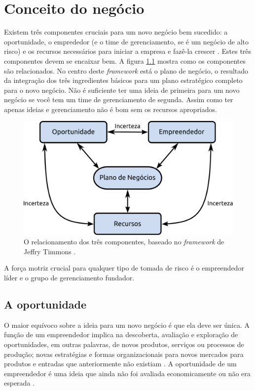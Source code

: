 \chapter{Conceito do negócio}

Existem três componentes cruciais para um novo negócio bem sucedido: a
oportunidade, o emprededor (e o time de gerenciamento, se é um negócio 
de alto risco) e os recursos necessários para iniciar a empresa e fazê-la
crescer \cite{bygrave2010entrepreneurship}. %
Estes três componentes devem se encaixar bem.
A figura \ref{componentes} mostra como os componentes são relacionados.
No centro deste \textit{framework}
está o plano de negócio, o resultado da integração dos três ingredientes
básicos para um plano estratégico completo para o novo negócio.
Não é suficiente ter uma ideia de primeira para um novo negócio se você tem 
um time de gerenciamento de segunda.  Assim como ter apenas ideias e gerenciamento
não é bom sem os recursos apropriados. 

\begin{figure}[!h]
	\begin{center}
		\includegraphics[scale=0.5]{../slides/imagens/componentes.pdf}
	\end{center}
	\caption{\label{componentes} O relacionamento dos três componentes, baseado no 
		\textit{framework} de Jeffry Timmons \cite{timmons2004new}.}			
\end{figure}

A força motriz crucial para qualquer tipo de tomada de risco é o empreendedor
líder e o grupo de gerenciamento fundador.

\section{A oportunidade}

O maior equívoco sobre a ideia para um novo negócio é que ela deve ser
única.  A função de um empreendedor implica na descoberta, avaliação
e exploração de oportunidades, em outras palavras, de novos produtos, 
serviços ou processos de produção; novas estratégias e formas
organizacionais para novos mercados para produtos
e entradas que anteriormente não existiam \cite{fayolle2007handbook}.
A oportunidade de um empreendedor é uma ideia que ainda não foi 
avaliada economicamente ou não era esperada \cite{cuervo2007entrepreneurship}.


